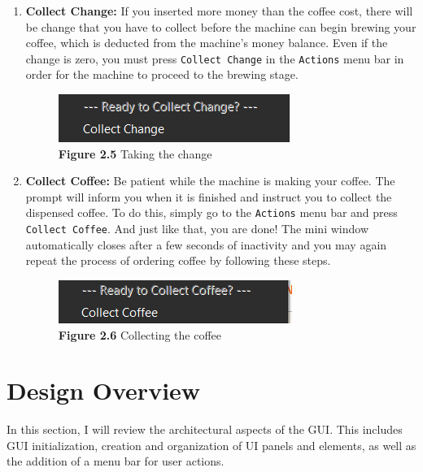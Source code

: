 \documentclass[a4paper, 11pt]{article}
\begin{document}
\begin{enumerate}
\item \textbf{Collect Change:}
If you inserted more money than the coffee cost, there will be change that you have to collect before the machine can begin brewing your coffee, which is deducted from the machine's money balance. Even if the change is zero, you must press \texttt{Collect Change} in the \texttt{Actions} menu bar in order for the machine to proceed to the brewing stage.
\vspace{3mm} 
\begin{figure}[H]
\centering
\includegraphics{Images/Figure2.5.PNG}
\caption*{\textbf{Figure 2.5} Taking the change} 
\end{figure}
\vspace{4mm} 

\item \textbf{Collect Coffee:}
Be patient while the machine is making your coffee. The prompt will inform you when it is finished and instruct you to collect the dispensed coffee. To do this, simply go to the \texttt{Actions} menu bar and press \texttt{Collect Coffee}. And just like that, you are done! The mini window automatically closes after a few seconds of inactivity and you may again repeat the process of ordering coffee by following these steps.
\vspace{3mm} 
\begin{figure}[H]
\centering
\includegraphics{Images/Figure2.6.PNG}
\caption*{\textbf{Figure 2.6} Collecting the coffee} 
\end{figure}
\vspace{4mm} 
\end{enumerate}

\section{Design Overview}
In this section, I will review the architectural aspects of the GUI. This includes GUI initialization, creation and organization of UI panels and elements, as well as the addition of a menu bar for user actions.
\end{document}
